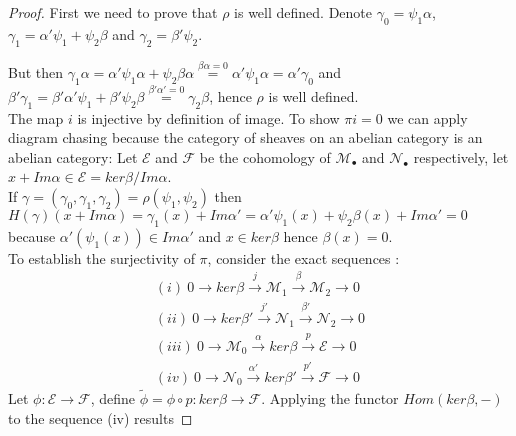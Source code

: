\documentclass[
	oldfontcommands,
	sumario=abnt-6027-2012,
	12pt,			%
	openright,		%
	oneside,		%
	a4paper,		%
	english,		%
	brazil			%
	]{imecc-unicamp}
\begin{document}
\begin{proof}

First we need to prove that $\rho$ is well defined. Denote $\gamma_0 =\psi_1 \alpha $, $\gamma_1 = \alpha' \psi_1 + \psi_2 \beta$ and $\gamma_2 = \beta' \psi_2$.
\begin{center}
\end{center}
But then $\gamma_1 \alpha = \alpha' \psi_1 \alpha + \psi_2 \beta \alpha \overset{\beta \alpha=0}{=} \alpha' \psi_1 \alpha = \alpha ' \gamma_0$ and $\beta' \gamma_1 = \beta' \alpha' \psi_1 + \beta' \psi_2 \beta \overset{\beta' \alpha'=0}{=} \gamma_2 \beta$, hence $\rho$ is well defined. \\
The map $i$ is injective by definition of image. To show $\pi i =0$ we can apply diagram chasing because the category of sheaves on an abelian category is an abelian category: Let $\mathcal{E}$ and $\mathcal{F}$ be the cohomology of $\mathcal{M}_\bullet$ and $\mathcal{N}_\bullet$ respectively, let $x + Im \alpha \in \mathcal{E}=ker \beta / Im \alpha$. \\ If $\gamma=(\gamma_0,\gamma_1,\gamma_2)=\rho(\psi_1,\psi_2)$ then $H(\gamma)(x+Im \alpha)=\gamma_1 (x) + Im \alpha' = \alpha' \psi_1 (x) + \psi_2 \beta (x) + Im \alpha'=0$ because $\alpha' (\psi_1(x)) \in Im\alpha'$ and $x \in ker \beta$ hence $\beta(x)=0$. \\
To establish the surjectivity of $\pi$, consider the exact sequences :
\begin{align*}
(i) \ 0 \to ker \beta \overset{j}{\to} \mathcal{M}_1 \overset{\beta}{\to} \mathcal{M}_2 \to 0 \\
(ii) \ 0 \to ker \beta' \overset{j'}{\to} \mathcal{N}_1 \overset{\beta'}{\to} \mathcal{N}_2 \to 0 \\
(iii) \ 0 \to \mathcal{M}_0 \overset{\alpha}{\to} ker \beta \overset{p}{\to} \mathcal{E} \to 0 \\
(iv) \ 0 \to \mathcal{N}_0 \overset{\alpha'}{\to} ker \beta' \overset{p'}{\to} \mathcal{F} \to 0
\end{align*}
Let $\phi : \mathcal{E} \to \mathcal{F}$, define $\tilde{\phi} =\phi \circ p : ker \beta \to \mathcal{F}$. Applying the functor $Hom (ker \beta, -)$ to the sequence (iv) results

\end{proof}
\end{document}
